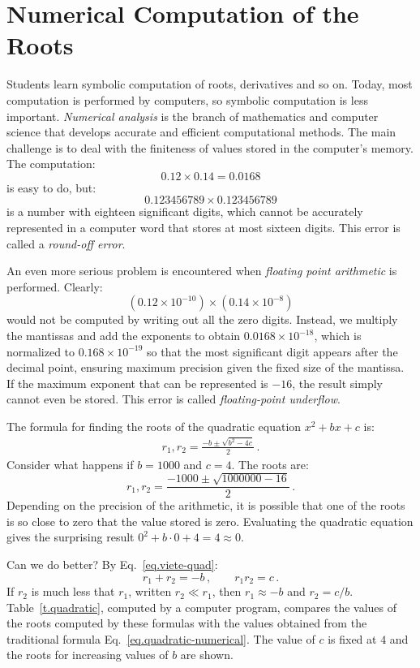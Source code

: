 \section{Numerical Computation of the Roots}\label{s.numerical}

Students learn symbolic computation of roots, derivatives and so on. Today, most computation is performed by computers, so symbolic computation is less important. \emph{Numerical analysis} is the branch of mathematics and computer science that develops accurate and efficient computational methods. The main challenge is to deal with the finiteness of values stored in the computer's memory. The computation:
\[0.12\times 0.14=0.0168\]
is easy to do, but:
\[
0.123456789\times 0.123456789\]
is a number with eighteen significant digits, which cannot be accurately represented in a computer word that stores at most sixteen digits. This error is called a \emph{round-off error}.

An even more serious problem is encountered when \emph{floating point arithmetic} is performed. Clearly:
\[(0.12\times 10^{-10})\times (0.14\times 10^{-8})\]
would not be computed by writing out all the zero digits. Instead, we multiply the mantissas and add the exponents to obtain $0.0168\times 10^{-18}$, which is normalized to $0.168\times 10^{-19}$ so that the most significant digit appears after the decimal point, ensuring maximum precision given the fixed size of the mantissa. If the maximum exponent that can be represented is $-16$, the result simply cannot even be stored. This error is called \emph{floating-point underflow}.

The formula for finding the roots of the quadratic equation $x^2+bx+c$ is:
\begin{align}
r_1, r_2 = \frac{-b\pm\sqrt{b^2-4c}}{2}\,.\label{eq.quadratic-numerical}
\end{align}
Consider what happens if $b=1000$ and $c=4$. The roots are:
\[
r_1, r_2 = \frac{-1000\pm\sqrt{1000000-16}}{2}\,.
\]
Depending on the precision of the arithmetic, it is possible that one of the roots is so close to zero that the value stored is zero. Evaluating the quadratic equation gives the surprising result $0^2+b\cdot 0 +4= 4\approx 0$.

Can we do better? By Eq.~\ref{eq.viete-quad}:
\[
r_1+r_2 = -b\,,\quad\quad r_1r_2=c\,.
\]
If $r_2$ is much less that $r_1$, written $r_2\ll r_1$, then $r_1\approx -b$ and $r_2=c/b$. Table~\ref{t.quadratic}, computed by a computer program, compares the values of the roots computed by these formulas with the values obtained from the traditional formula Eq.~\ref{eq.quadratic-numerical}. The value of $c$ is fixed at $4$ and the roots for increasing values of $b$ are shown.

